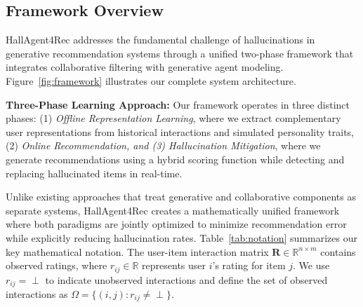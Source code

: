 \documentclass[acmsmall]{acmart}
\begin{document}
\subsection{Framework Overview}
\label{sec:framework_overview}

HallAgent4Rec addresses the fundamental challenge of hallucinations in generative recommendation systems through a unified two-phase framework that integrates collaborative filtering with generative agent modeling. Figure~\ref{fig:framework} illustrates our complete system architecture.

\textbf{Three-Phase Learning Approach:} Our framework operates in three distinct phases: (1) \textit{Offline Representation Learning}, where we extract complementary user representations from historical interactions and simulated personality traits, (2) \textit{Online Recommendation, and (3) Hallucination Mitigation}, where we generate recommendations using a hybrid scoring function while detecting and replacing hallucinated items in real-time.

Unlike existing approaches that treat generative and collaborative components as separate systems, HallAgent4Rec creates a mathematically unified framework where both paradigms are jointly optimized to minimize recommendation error while explicitly reducing hallucination rates.
Table~\ref{tab:notation} summarizes our key mathematical notation. 
The user-item interaction matrix $\mathbf{R} \in \mathbb{R}^{n \times m}$ contains observed ratings, where $r_{ij} \in \mathbb{R}$ represents user $i$'s rating for item $j$. We use $r_{ij} = \perp$ to indicate unobserved interactions and define the set of observed interactions as $\Omega = \{(i,j) : r_{ij} \neq \perp\}$.
\end{document}
